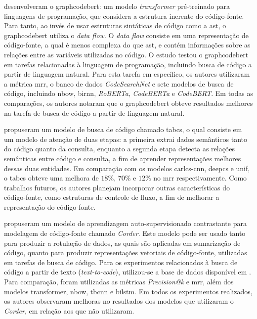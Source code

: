 \textcite{Guo2021GraphCodeBERTPC} desenvolveram o \gls{graphcodebert}: um modelo \textit{transformer} pré-treinado para linguagens de programação, que considera a estrutura inerente do código-fonte. Para tanto, ao invés de usar estruturas sintáticas de código como a \gls{ast}, o \gls{graphcodebert} utiliza o \textit{data flow}. O \textit{data flow} consiste em uma representação de código-fonte, a qual é menos complexa do que \gls{ast}, e contém informações sobre as relações entre as variáveis utilizadas no código. O estudo testou o \gls{graphcodebert} em tarefas relacionadas à linguagem de programação, incluindo busca de código a partir de linguagem natural. Para esta tarefa em específico, os autores utilizaram a métrica \gls{mrr}, o banco de dados \textit{CodeSearchNet} \cite{Husain2019CodeSearchNetCE} e sete modelos de busca de código, incluindo \gls{nbow}, \gls{birnn}, \textit{RoBERTa}, \textit{CodeBERTa} e \textit{CodeBERT}. Em todas as comparações, os autores notaram que o \gls{graphcodebert} obteve resultados melhores na tarefa de busca de código a partir de linguagem natural.

\textcite{Xu2021TwoStageAM} propuseram um modelo de busca de código chamado \gls{tabcs}, o qual consiste em um modelo de atenção de duas etapas: a primeira extrai dados semânticos tanto do código quanto da consulta, enquanto a segunda etapa detecta as relações semânticas entre código e consulta, a fim de aprender representações melhores dessas duas entidades. Em comparação com os modelos \gls{carlcs-cnn}, \gls{deepcs} e \gls{unif}, o \gls{tabcs} obteve uma melhora de $18\%$, $70\%$ e $12\%$ no \gls{mrr} respectivamente. Como trabalhos futuros, os autores planejam incorporar outras características do código-fonte, como estruturas de controle de fluxo, a fim de melhorar a representação do código-fonte.

\textcite{Bui2021SelfSupervisedCL} propuseram um modelo de aprendizagem auto-supervisionado contrastante para modelagem de código-fonte chamado \textit{Corder}. Este modelo pode ser usado tanto para produzir a rotulação de dados, as quais são aplicadas em sumarização de código, quanto para produzir representações  vetoriais de código-fonte, utilizadas em tarefas de busca de código. Para os experimentos relacionados à busca de código a partir de texto (\textit{text-to-code}), utilizou-se a base de dados disponível em \cite{Gu2018DeepCS}. Para comparação, foram utilizadas as métricas \textit{Precision@k} e \gls{mrr}, além dos modelos transformer, \gls{nbow}, \gls{tbcnn} e \gls{bilstm}. Em todos os experimentos realizados, os autores observaram melhoras no resultados dos modelos que utilizaram o \textit{Corder}, em relação aos que não utilizaram.

